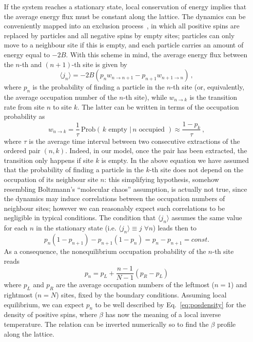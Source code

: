 \documentclass[iop, twocolumns, amssymb,notitlepage]{revtex4-1}
\newcommand{\indice}{n}
\newcommand{\hh}{B}
\begin{document}
 If the system reaches a stationary state, local conservation of energy implies 
that the average energy flux must be constant along the lattice. The dynamics 
can be conveniently mapped into an exclusion process~\cite{iubini14}, in which all 
positive spins are replaced by particles and all negative spins by empty sites; 
particles can only move to a neighbour site if this is empty, and each particle 
carries an amount of energy equal to $-2\hh$. With this scheme in mind, the 
average energy flux between the $\indice$-th and  $(\indice+1)$-th site is given by 
\begin{equation}
\label{eq:jspin}
\langle j_\indice \rangle=-2\hh\left(p_\indice w_{\indice\to \indice+1} - p_{\indice+1} w_{\indice+1\to \indice}\right)\,,
 \end{equation} 
 where $p_\indice$ is the probability of finding a particle in the $\indice$-th site (or, 
equivalently, the average occupation number of the $\indice$-th site), while $w_{\indice\to 
k}$ is the transition rate from site $\indice$ to site $k$. The latter can be written 
in terms of the occupation probability as
\begin{equation}
\label{eq:wspin}
  w_{\indice\to k}=\frac{1}{\tau}\, \text{Prob}(\,k \text{ empty } |\, \indice \text{ occupied } ) \approx \frac{1-p_k}{\tau}\,,
 \end{equation} 
where $\tau$ is the average time interval between two consecutive extractions of 
the ordered pair $(\indice,k)$. Indeed, in our model, once the pair has been 
extracted, the transition only happens if site $k$ is empty. In the above 
equation we have assumed that the probability of finding a particle in the $k$-th 
site does not depend on the occupation of its neighbour site $\indice$: this simplifying 
hypothesis, somehow resembling Boltzmann's ``molecular chaos'' assumption, is 
actually not true, since the dynamics may induce correlations between the 
occupation numbers of neighbour sites; however we can reasonably expect such 
correlations to be negligible in typical conditions. The condition that $\langle j_\indice \rangle$ 
assumes the same value for each $\indice$ in the stationary state (i.e. $\langle j_\indice \rangle \equiv j$ $\forall \indice$) leads then to
\begin{equation}
 p_\indice (1-p_{\indice+1})- p_{\indice+1} (1-p_{\indice})=p_\indice-p_{\indice+1}=const.
\end{equation} 
  As a consequence, the  nonequilibrium occupation probability of the $\indice$-th site reads
  \begin{equation}
  \label{eq:profilep}
   p_\indice=p_L+\frac{\indice-1}{N-1}(p_R-p_L)
  \end{equation}
  where $p_L$ and $p_R$ are the average occupation numbers of the leftmost 
($\indice=1$) and rightmost ($\indice=N$) sites, fixed by the boundary conditions. Assuming 
local equilibrium, we can expect $p_\indice$ to be well described by 
Eq.~\eqref{eq:posdensity} for the density of positive spins, where $\beta$ has 
now the meaning of a local inverse temperature. The relation can be inverted 
numerically so to find the $\beta$ profile along the lattice.
  
\end{document}
